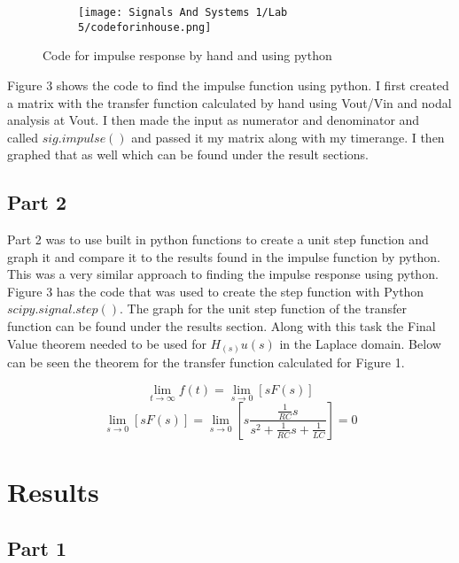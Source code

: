 \documentclass[12pt,a4paper]{article}
\begin{document}
\begin{figure}[h]
\begin{subfigure}{ 1\textwidth}
\texttt{[image: Signals And Systems 1/Lab 5/codeforinhouse.png]}
\end{subfigure}
\caption{Code for impulse response by hand and using python}
\label{fig:image2}
\end{figure}


Figure 3 shows the code to find the impulse function using python. I first created a matrix with the transfer function calculated by hand using Vout/Vin and nodal analysis at Vout. I then made the input as numerator and denominator and called $sig.impulse()$ and passed it my matrix along with my timerange. I then graphed that as well which can be found under the result sections. 


\subsection{Part 2}
Part 2 was to use built in python functions to create a unit step function and graph it and compare it to the results found in the impulse function by python. This was a very similar approach to finding the impulse response using python. Figure 3 has the code that was used to create the step function with Python $scipy.signal.step()$. The graph for the unit step function of the transfer function can be found under the results section. Along with this task the Final Value theorem needed to be used for $H_(s)u(s)$ in the Laplace domain. Below can be seen the theorem for the transfer function calculated for Figure 1.

\[\lim_{t\to\infty}{f(t)} = \lim_{s\to0}[sF(s)]\]
\[\lim_{s\to0}[sF(s)] = \lim_{s\to0}[s\frac{\frac{1}{RC}s}{s^2+\frac{1}{RC}s + \frac{1}{LC}}] = 0\]



\clearpage







\clearpage

\section{Results}\label{sec:res}

\subsection{Part 1}
\end{document}
